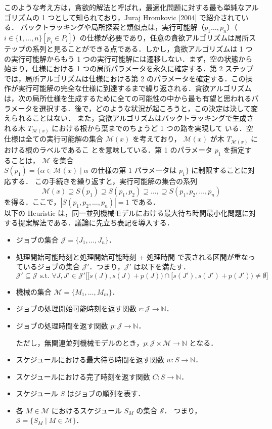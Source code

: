 \documentclass[12pt]{optlab-bachelor}
\begin{document}
このような考え方は，貪欲的解法と呼ばれ，最適化問題に対する最も単純なアルゴリズムの 1 つとして知られており，Juraj Hromkovic [2004] \cite{greedy} で紹介されている．
バックトラッキングや局所探索と類似点は，実行可能解（$p_1\ldots,p_n$）（$i \in \{1,\ldots,n\}[p_i \in P_i]$）の仕様が必要であり，任意の貪欲アルゴリズムは局所ステップの系列と見ることができる点である．しかし，貪欲アルゴリズムは 1 つの実行可能解からもう 1 つの実行可能解には遷移しない．まず，空の状態から始まり，仕様における 1 つの局所パラメータを永久に確定する．第 2 ステップでは，局所アルゴリズムは仕様における第 2 のパラメータを確定する．この操作が実行可能解の完全な仕様に到達するまで繰り返される．貪欲アルゴリズムは，次の局所仕様を生成するために全ての可能性の中から最も有望と思われるパラメータを選択する．後で，どのような状況が起ころうと，この決定は決して変えられることはない．
また，貪欲アルゴリズムはバックトラッキングで生成される木
$T_{\mathcal{M}(x)}$ における根から葉までのちょうど 1 つの路を実現して
いる．空仕様は全ての実行可能解の集合 $\mathcal{M}(x)$ を考えており，
$\mathcal{M}(x)$ が木 $T_{\mathcal{M}(x)}$ における根のラベルであるこ
とを意味している．第 1 のパラメータ $p_1$ を指定することは，
$\mathcal{M}$ を集合 $S(p_1) = \{\alpha \in \mathcal{M}(x) \mid \alpha
\text{ の仕様の第 1 パラメータは } p_1\}$ に制限することに対応する．
この手続きを繰り返すと，実行可能解の集合の系列
$$\mathcal{M}(x) \supseteq S(p_1) \supseteq S(p_1,p_2) \supseteq
\ldots, \supseteq S(p_1,p_2,\ldots,p_n)$$
を得る．ここで，$|S(p_1,p_2,\ldots,p_n)| = 1$ である．\\

\noindent 以下の {\sc Heuristic} は，同一並列機械モデルにおける最大待ち時間最小化問題に対する提案解法である．議論に先立ち表記を導入する．

\begin{itemize}
  \item ジョブの集合 $\mathcal{J} = \{J_1,\ldots,J_n\}$．
  \item 処理開始可能時刻と処理開始可能時刻 + 処理時間 で表される区間が重なっているジョブの集合 $\mathcal{J}'$．つまり，$\mathcal{J}'$ は以下を満たす．
  $$\mathcal{J}' \subseteq \mathcal{J} \text{ s.t. }\forall J,J' \in \mathcal{J}'\big[[s(J),s(J) + p(J)) \cap [s(J'),s(J') + p(J')) \neq \emptyset\big]$$
  \item 機械の集合 $\mathcal{M} = \{M_1,\ldots,M_m\}$．
  \item ジョブの処理開始可能時刻を返す関数 $r : \mathcal{J} \to \mathbb{N}$．
  \item ジョブの処理時間を返す関数 $p : \mathcal{J} \to \mathbb{N}$．

  ただし，無関連並列機械モデルのとき，$p : \mathcal{J} \times \mathcal{M} \to \mathbb{N}$ となる．
  \item スケジュールにおける最大待ち時間を返す関数 $w : S \to \mathbb{N}$．
  \item スケジュールにおける完了時刻を返す関数 $C : S \to \mathbb{N}$．
  \item スケジュール $S$ はジョブの順列を表す．
  \item 各 $M \in \mathcal{M}$ におけるスケジュール $S_M$ の集合 $\mathcal{S}$．
  つまり，$\mathcal{S} = \{S_M \mid M \in \mathcal{M}\}$．
\end{itemize}
\end{document}
